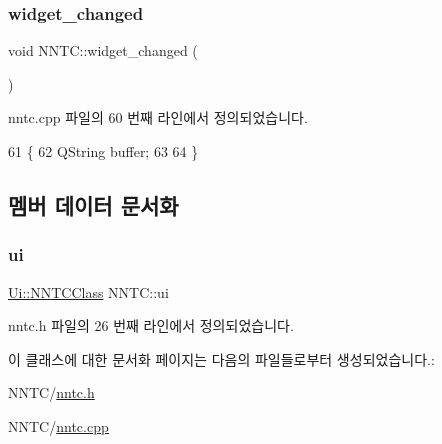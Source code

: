 \subsubsection{\texorpdfstring{widget\+\_\+changed}{widget\_changed}}
{\footnotesize\ttfamily void N\+N\+T\+C\+::widget\+\_\+changed (\begin{DoxyParamCaption}{ }\end{DoxyParamCaption})\hspace{0.3cm}{\ttfamily [slot]}}



nntc.\+cpp 파일의 60 번째 라인에서 정의되었습니다.


\begin{DoxyCode}
61 \{
62     QString buffer;
63 
64 \}
\end{DoxyCode}


\subsection{멤버 데이터 문서화}
\mbox{\label{class_n_n_t_c_aafbe297818dd00b2c0f791ebb06292a4}} 
\subsubsection{\texorpdfstring{ui}{ui}}
{\footnotesize\ttfamily \mbox{\hyperlink{class_ui_1_1_n_n_t_c_class}{Ui\+::\+N\+N\+T\+C\+Class}} N\+N\+T\+C\+::ui\hspace{0.3cm}{\ttfamily [private]}}



nntc.\+h 파일의 26 번째 라인에서 정의되었습니다.



이 클래스에 대한 문서화 페이지는 다음의 파일들로부터 생성되었습니다.\+:\begin{DoxyCompactItemize}
\item 
N\+N\+T\+C/\mbox{\hyperlink{nntc_8h}{nntc.\+h}}\item 
N\+N\+T\+C/\mbox{\hyperlink{nntc_8cpp}{nntc.\+cpp}}\end{DoxyCompactItemize}
